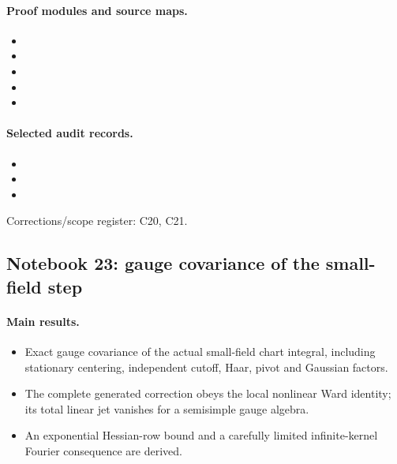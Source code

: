 \documentclass[11pt]{article}
\theoremstyle{remark}
\begin{document}
\paragraph{Proof modules and source maps.}
\begingroup\small
\begin{itemize}
\item {}
\item {}
\item {}
\item {}
\item {}
\end{itemize}
\endgroup

\paragraph{Selected audit records.}
\begingroup\small
\begin{itemize}
\item {}
\item {}
\item {}
\end{itemize}
\endgroup
Corrections/scope register: C20, C21.\par

\subsection{Notebook 23: gauge covariance of the small-field step}
\label{hnc-23}
\noindent{}\par

\paragraph{Main results.}
\begin{itemize}
\item Exact gauge covariance of the actual small-field chart integral, including stationary centering, independent cutoff, Haar, pivot and Gaussian factors.
\item The complete generated correction obeys the local nonlinear Ward identity; its total linear jet vanishes for a semisimple gauge algebra.
\item An exponential Hessian-row bound and a carefully limited infinite-kernel Fourier consequence are derived.
\end{itemize}
\end{document}
